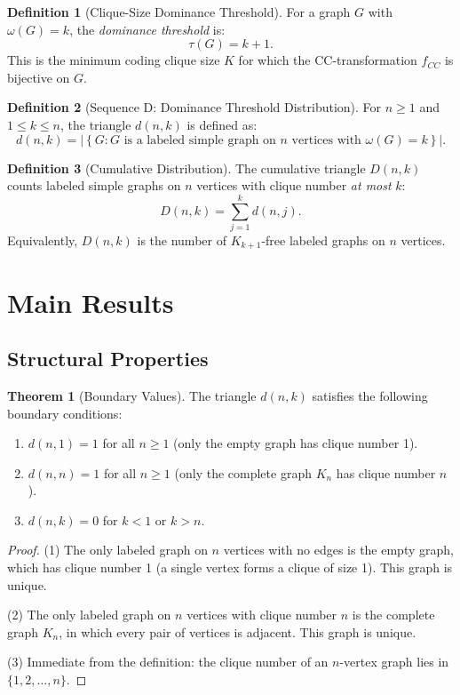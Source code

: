 \documentclass[11pt,a4paper]{article}
\theoremstyle{definition}
\newtheorem{definition}{Definition}[section]
\newtheorem{theorem}{Theorem}[section]
\begin{document}
\begin{definition}[Clique-Size Dominance Threshold]
For a graph $G$ with $\omega(G) = k$, the \emph{dominance threshold} is:
\[
\tau(G) = k + 1.
\]
This is the minimum coding clique size $K$ for which the CC-transformation $f_{CC}$ is bijective on $G$.
\end{definition}

\begin{definition}[Sequence D: Dominance Threshold Distribution]
For $n \geq 1$ and $1 \leq k \leq n$, the triangle $d(n, k)$ is defined as:
\[
d(n, k) = \left| \left\{ G : G \text{ is a labeled simple graph on } n \text{ vertices with } \omega(G) = k \right\} \right|.
\]
\end{definition}

\begin{definition}[Cumulative Distribution]
The cumulative triangle $D(n, k)$ counts labeled simple graphs on $n$ vertices with clique number \emph{at most} $k$:
\[
D(n, k) = \sum_{j=1}^{k} d(n, j).
\]
Equivalently, $D(n, k)$ is the number of $K_{k+1}$-free labeled graphs on $n$ vertices.
\end{definition}

\section{Main Results}

\subsection{Structural Properties}

\begin{theorem}[Boundary Values]
The triangle $d(n, k)$ satisfies the following boundary conditions:
\begin{enumerate}
\item $d(n, 1) = 1$ for all $n \geq 1$ (only the empty graph has clique number 1).
\item $d(n, n) = 1$ for all $n \geq 1$ (only the complete graph $K_n$ has clique number $n$).
\item $d(n, k) = 0$ for $k < 1$ or $k > n$.
\end{enumerate}
\end{theorem}

\begin{proof}
(1) The only labeled graph on $n$ vertices with no edges is the empty graph, which has clique number 1 (a single vertex forms a clique of size 1). This graph is unique.

(2) The only labeled graph on $n$ vertices with clique number $n$ is the complete graph $K_n$, in which every pair of vertices is adjacent. This graph is unique.

(3) Immediate from the definition: the clique number of an $n$-vertex graph lies in $\{1, 2, \ldots, n\}$.
\end{proof}
\end{document}
